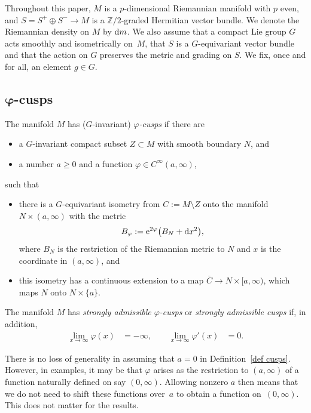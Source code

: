 \documentclass[10pt,a4paper]{amsart}
\numberwithin{equation}{section}
\newcommand{\Z}{\mathbb{Z}}
\begin{document}
Throughout this paper, $M$ is a $p$-dimensional Riemannian manifold with $p$ even, and $S = S^+ \oplus S^-\to M$ is a $\Z/2$-graded Hermitian vector bundle.
We denote the Riemannian density on $M$ by ${\rm d}m$. We also assume that a compact Lie group $G$ acts smoothly and isometrically on~$M$, that $S$ is a $G$-equivariant vector bundle and that the action on $G$ preserves the metric and grading on $S$. We fix, once and for all, an element $g \in G$.

\subsection[varphi-cusps]{$\boldsymbol{\varphi}$-cusps}

\begin{Definition}\label{def cusps}
The manifold $M$ has ($G$-invariant) \emph{$\varphi$-cusps} if there are
 \begin{itemize}\itemsep=0pt
 \item a $G$-invariant compact subset $Z \subset M$ with smooth boundary $N$, and
 \item a number $a\geq 0$ and a function $\varphi \in C^{\infty}(a,\infty)$,
 \end{itemize}
 such that
 \begin{itemize}\itemsep=0pt
 \item
 there is a $G$-equivariant isometry from
$C:= {M \setminus Z}$ onto the manifold $N \times (a,\infty)$ with the metric
\begin{equation} \label{eq g phi}
 B_{\varphi} := {\rm e}^{2\varphi}\big(B_N + {\rm d}x^2\big),
\end{equation}
where $B_N$ is the restriction of the Riemannian metric to $N$ and $x$ is the coordinate in $(a,\infty)$, and
\item
this isometry has a continuous extension to a map $\overline{C} \to N \times [a, \infty)$, which maps $N$ onto $N \times \{a\}$.
\end{itemize}
The manifold $M$ has \emph{strongly admissible $\varphi$-cusps} or \emph{strongly admissible cusps} if, in addition,
\begin{equation} \label{eq strong adm}
\begin{aligned}
\lim_{x \to \infty} \varphi(x) &= -\infty,\qquad
\lim_{x \to \infty} \varphi'(x) &= 0.
\end{aligned}
\end{equation}
\end{Definition}

\begin{Remark}%
There is no loss of generality in assuming that $a=0$ in Definition~\ref{def cusps}. However, in examples, it may be that $\varphi$ arises as the restriction to $(a, \infty)$ of a function naturally defined on say $(0, \infty)$. Allowing nonzero $a$ then means that we do not need to shift these functions over~$a$ to obtain a function on~$(0, \infty)$. This does not matter for the results.
\end{Remark}
\end{document}
